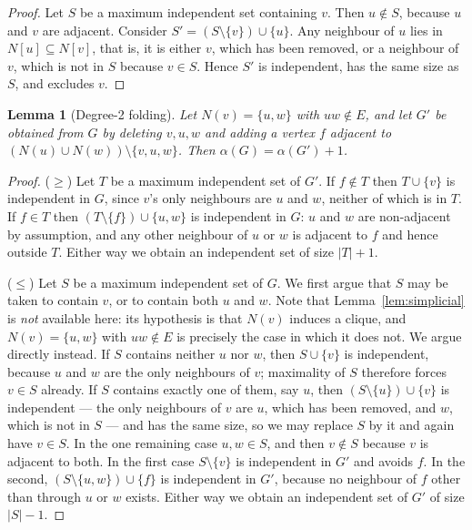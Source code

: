 \documentclass[preprint,authoryear,11pt]{elsarticle}
\newtheorem{lemma}[theorem]{Lemma}
\theoremstyle{definition}
\begin{document}
\begin{proof}
Let $S$ be a maximum independent set containing $v$. Then $u \notin S$, because
$u$ and $v$ are adjacent. Consider $S' = (S \setminus \{v\}) \cup \{u\}$. Any
neighbour of $u$ lies in $N[u] \subseteq N[v]$, that is, it is either $v$, which
has been removed, or a neighbour of $v$, which is not in $S$ because $v \in S$.
Hence $S'$ is independent, has the same size as $S$, and excludes $v$.
\end{proof}

\begin{lemma}[Degree-2 folding]
\label{lem:fold}
Let $N(v) = \{u,w\}$ with $uw \notin E$, and let $G'$ be obtained from $G$ by
deleting $v,u,w$ and adding a vertex $f$ adjacent to
$(N(u) \cup N(w)) \setminus \{v,u,w\}$. Then $\alpha(G) = \alpha(G') + 1$.
\end{lemma}

\begin{proof}
($\ge$) Let $T$ be a maximum independent set of $G'$. If $f \notin T$ then
$T \cup \{v\}$ is independent in $G$, since $v$'s only neighbours are $u$ and
$w$, neither of which is in $T$. If $f \in T$ then $(T \setminus \{f\}) \cup
\{u,w\}$ is independent in $G$: $u$ and $w$ are non-adjacent by assumption, and
any other neighbour of $u$ or $w$ is adjacent to $f$ and hence outside $T$.
Either way we obtain an independent set of size $|T| + 1$.

($\le$) Let $S$ be a maximum independent set of $G$. We first argue that $S$
may be taken to contain $v$, or to contain both $u$ and $w$. Note that
Lemma~\ref{lem:simplicial} is \emph{not} available here: its hypothesis is that
$N(v)$ induces a clique, and $N(v) = \{u,w\}$ with $uw \notin E$ is precisely the
case in which it does not. We argue directly instead. If $S$ contains neither
$u$ nor $w$, then $S \cup \{v\}$ is independent, because $u$ and $w$ are the only
neighbours of $v$; maximality of $S$ therefore forces $v \in S$ already. If $S$
contains exactly one of them, say $u$, then $(S \setminus \{u\}) \cup \{v\}$ is
independent --- the only neighbours of $v$ are $u$, which has been removed, and
$w$, which is not in $S$ --- and has the same size, so we may replace $S$ by it
and again have $v \in S$. In the one remaining case $u,w \in S$, and then
$v \notin S$ because $v$ is adjacent to both. In the first case
$S \setminus \{v\}$ is independent in $G'$ and avoids $f$. In the second,
$(S \setminus \{u,w\}) \cup \{f\}$ is independent in $G'$, because no neighbour
of $f$ other than through $u$ or $w$ exists. Either way we obtain an independent
set of $G'$ of size $|S| - 1$.
\end{proof}
\end{document}
